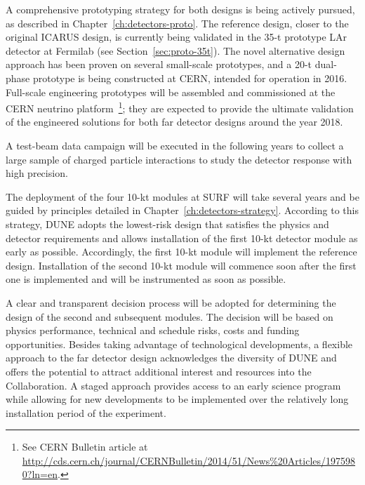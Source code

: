 A comprehensive prototyping strategy for both designs is being
actively pursued, as described in Chapter~\ref{ch:detectors-proto}.
The reference design, closer to the original ICARUS design, is
currently being validated in the 35-t prototype LAr detector at
Fermilab (see Section~\ref{sec:proto-35t}).  The novel alternative
design approach has been proven on several small-scale prototypes, and
a 20-t dual-phase prototype is being constructed at CERN, intended for
operation in 2016.  Full-scale engineering prototypes will be
assembled and commissioned at the CERN neutrino platform~\footnote{See
  CERN Bulletin article at
  \href{http://cds.cern.ch/journal/CERNBulletin/2014/51/News\%20Articles/1975980?ln=en}{http://cds.cern.ch/journal/CERNBulletin/2014/51/News\%20Articles/1975980?ln=en}.};
they are expected to provide the ultimate validation of the engineered
solutions for both far detector designs around the year 2018.

A test-beam data campaign will be executed in the following years to
collect a large sample of charged particle interactions to study the
detector response with high precision.

The deployment of the four 10-kt modules at SURF will take several
years and be guided by principles detailed in
Chapter~\ref{ch:detectors-strategy}. According to this strategy, DUNE
adopts the lowest-risk design that satisfies the physics and detector
requirements and allows installation of the first 10-kt detector
module as early as possible.  Accordingly, the first 10-kt module will
implement the reference design.  Installation of the second 10-kt
module will commence soon after the first one is implemented
 and will be
instrumented as soon as possible.


A clear and transparent decision process will be adopted for
determining the design of the second and subsequent modules.  The
decision will be based on physics performance, technical and schedule
risks, costs and funding opportunities.  Besides taking advantage of
technological developments, a flexible approach to the far detector
design acknowledges the diversity of DUNE and offers the potential to
attract additional interest and resources into the Collaboration. A
staged approach provides access to an early science program while
allowing for new developments to be implemented over the relatively
long installation period of the experiment.

